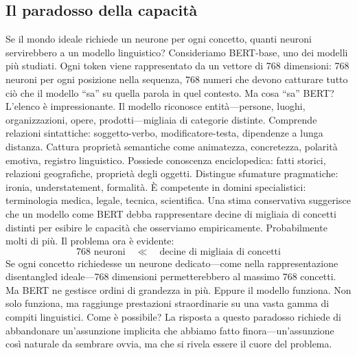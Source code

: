 \subsection{Il paradosso della capacità}
\label{subsec:paradosso_capacita}
Se il mondo ideale richiede un neurone per ogni concetto, quanti neuroni servirebbero a un modello linguistico?
Consideriamo BERT-base, uno dei modelli più studiati. Ogni token viene rappresentato da un vettore di 768 dimensioni: 768 neuroni per ogni posizione nella sequenza, 768 numeri che devono catturare tutto ciò che il modello ``sa'' su quella parola in quel contesto.
Ma cosa ``sa'' BERT? L'elenco è impressionante. Il modello riconosce entità—persone, luoghi, organizzazioni, opere, prodotti—migliaia di categorie distinte. Comprende relazioni sintattiche: soggetto-verbo, modificatore-testa, dipendenze a lunga distanza. Cattura proprietà semantiche come animatezza, concretezza, polarità emotiva, registro linguistico. Possiede conoscenza enciclopedica: fatti storici, relazioni geografiche, proprietà degli oggetti. Distingue sfumature pragmatiche: ironia, understatement, formalità. È competente in domini specialistici: terminologia medica, legale, tecnica, scientifica.
Una stima conservativa suggerisce che un modello come BERT debba rappresentare decine di migliaia di concetti distinti per esibire le capacità che osserviamo empiricamente. Probabilmente molti di più.
Il problema ora è evidente:
\begin{equation}
    768 \text{ neuroni} \quad \ll \quad \text{decine di migliaia di concetti}
\end{equation}
Se ogni concetto richiedesse un neurone dedicato—come nella rappresentazione disentangled ideale—768 dimensioni permetterebbero al massimo 768 concetti. Ma BERT ne gestisce ordini di grandezza in più.
Eppure il modello funziona. Non solo funziona, ma raggiunge prestazioni straordinarie su una vasta gamma di compiti linguistici. Come è possibile?
La risposta a questo paradosso richiede di abbandonare un'assunzione implicita che abbiamo fatto finora—un'assunzione così naturale da sembrare ovvia, ma che si rivela essere il cuore del problema.
